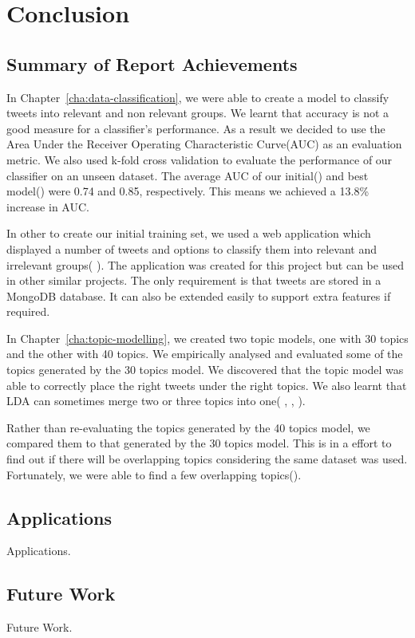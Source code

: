 
\chapter{Conclusion}
\label{ch:conclusions}

\section{Summary of Report Achievements}
In Chapter~\ref{cha:data-classification}, we were able to create a model to classify tweets into
relevant and non relevant groups. We learnt that accuracy is not a good measure for a classifier's
performance. As a result we decided to use the Area Under the Receiver Operating Characteristic
Curve(AUC) as an evaluation metric. We also used k-fold cross validation to evaluate the performance
of our classifier on an unseen dataset. The average AUC of our
initial() and best
model() were 0.74 and 0.85, respectively. This means we
achieved a 13.8\% increase in AUC.

In other to create our initial training set, we used a web application which displayed a number of
tweets and options to classify them into relevant and irrelevant groups( ). The
application was created for this project but can be used in other similar projects. The only
requirement is that tweets are stored in a MongoDB database. It can also be extended easily to
support extra features if required.

In Chapter~\ref{cha:topic-modelling}, we created two topic models, one with 30 topics and the other
with 40 topics. We empirically analysed and evaluated some of the topics generated by the 30 topics
model. We discovered that the topic model was able to correctly place the right tweets under the
right topics. We also learnt that LDA can sometimes merge two or three topics into one(
, , ).

Rather than re-evaluating the topics generated by the 40 topics model, we compared them to that
generated by the 30 topics model. This is in a effort to find out if there will be overlapping
topics considering the same dataset was used. Fortunately, we were able to find a few overlapping
topics().

\section{Applications}

Applications.


\section{Future Work}

Future Work.
